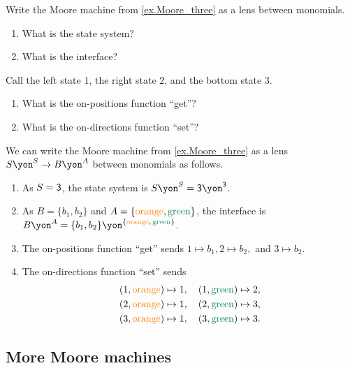 \documentclass[Book-Poly]{subfiles}
\begin{document}
\begin{exercise}
Write the Moore machine from \cref{ex.Moore_three} as a lens between monomials.
\begin{enumerate}
    \item What is the state system?
    \item What is the interface?
\end{enumerate}
Call the left state $1$, the right state $2$, and the bottom state $3$.
\begin{enumerate}[resume]
    \item What is the on-positions function ``get''?
    \item What is the on-directions function ``set''? \qedhere
\end{enumerate}
\begin{solution}
We can write the Moore machine from \cref{ex.Moore_three} as a lens $S\yon^S\to B\yon^A$ between monomials as follows.
\begin{enumerate}
    \item As $S=\textsf{3}$, the state system is $S\yon^S=\3\yon^\3$.
    \item As $B=\{b_1,b_2\}$ and $A=\{{\color{orange}\text{orange}},{\color{dgreen}\text{green}}\}$, the interface is $B\yon^A=\{b_1,b_2\}\yon^{\{{\color{orange}\text{orange}},\,{\color{dgreen}\text{green}}\}}$.
    \item The on-positions function ``get'' sends $1\mapsto b_1, 2\mapsto b_2,$ and $3\mapsto b_2$.
    \item The on-directions function ``set'' sends
    \begin{align*}
        (1, {\color{orange}\text{orange}})\mapsto1&,\quad(1, {\color{dgreen}\text{green}})\mapsto2, \\
        (2, {\color{orange}\text{orange}})\mapsto1&,\quad(2, {\color{dgreen}\text{green}})\mapsto3, \\
        (3, {\color{orange}\text{orange}})\mapsto1&,\quad(3, {\color{dgreen}\text{green}})\mapsto3.
    \end{align*}
\end{enumerate}
\end{solution}
\end{exercise}

\subsection{More Moore machines}
\end{document}
